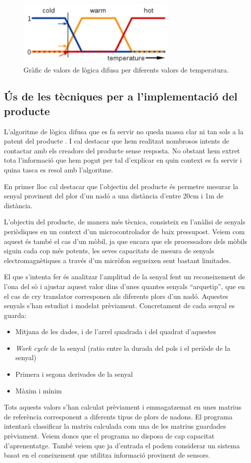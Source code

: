 \documentclass[11pt,a4paper]{article}
\begin{document}
\begin{figure}[hbt]
\centering
\includegraphics[width=0.7\textwidth]{./fig/fuzzy.png}
\caption{Gràfic de valors de lògica difusa per diferents valors de temperatura.}
\label{fig:calor}
\end{figure}
\clearpage


\subsection{\textsf{Ús de les tècniques per a l'implementació del producte}}
\label{us-tecniques}

L'algoritme de lògica difusa que es fa servir no queda massa clar ni tan sols a la patent del producte \cite{patent}. I cal destacar que hem realitzat nombrosos intents de contactar amb els creadors del producte sense resposta. No obstant hem extret tota l'informació que hem pogut per tal d'explicar en quin context es fa servir i quina tasca es resol amb l'algoritme.

En primer lloc cal destacar que l'objectiu del producte és permetre mesurar la senyal provinent del plor d'un nadó a una distància d'entre 20cm i 1m de distància.

L'objectiu del producte, de manera més tècnica, consisteix en l'anàlisi de senyals periòdiques en un context d'un microcontrolador de baix pressupost. Veiem com aquest és també el cas d'un mòbil, ja que encara que els processadors dels mòbils siguin cada cop més potents, les seves capacitats de mesura de senyals electromagnètiques a través d'un micròfon segueixen sent bastant limitades.

El que s'intenta fer és analitzar l'amplitud de la senyal fent un reconeixement de l'ona del sò i ajustar aquest valor dins d'unes quantes senyals ``arquetip'', que en el cas de cry translator corresponen als diferents plors d'un nadó. Aquestes senyals s'han estudiat i modelat prèviament. Concretament de cada senyal es guarda:
\begin{itemize}
\item Mitjana de les dades, i de l'arrel quadrada i del quadrat d'aquestes
\item \emph{Work cycle} de la senyal (ratio entre la durada del pols i el periòde de la senyal)
\item Primera i segona derivades de la senyal
\item Màxim i mínim
\end{itemize}
Tots aquests valors s'han calculat prèviament i emmagatzemat en unes matrius de referència corresponent a diferents tipus de plors de nadons. El programa intentarà classificar la matriu calculada com una de les matrius guardades prèviament. Veiem doncs que el programa no disposa de cap capacitat d'aprenentatge. També veiem que ja d'entrada el podem considerar un sistema basat en el coneixement que utilitza informació provinent de sensors.
\end{document}
